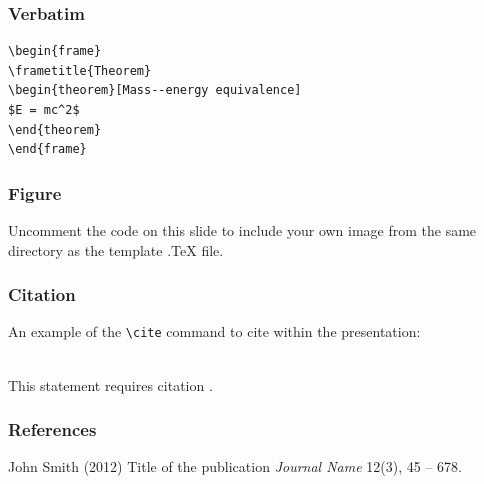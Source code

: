 \documentclass{beamer}
\begin{document}

\begin{frame}[fragile] %
\frametitle{Verbatim}
\begin{example}
\begin{verbatim}
\begin{frame}
\frametitle{Theorem}
\begin{theorem}[Mass--energy equivalence]
$E = mc^2$
\end{theorem}
\end{frame}\end{verbatim}
\end{example}
\end{frame}


\begin{frame}
\frametitle{Figure}
Uncomment the code on this slide to include your own image from the same directory as the template .TeX file.
\end{frame}


\begin{frame}[fragile] %
\frametitle{Citation}
An example of the \verb|\cite| command to cite within the presentation:\\~

This statement requires citation \cite{p1}.
\end{frame}


\begin{frame}
\frametitle{References}
\footnotesize{
\begin{thebibliography}{99} %
 John Smith (2012)
\newblock Title of the publication
\newblock \emph{Journal Name} 12(3), 45 -- 678.
\end{thebibliography}
}
\end{frame}

\end{document}

